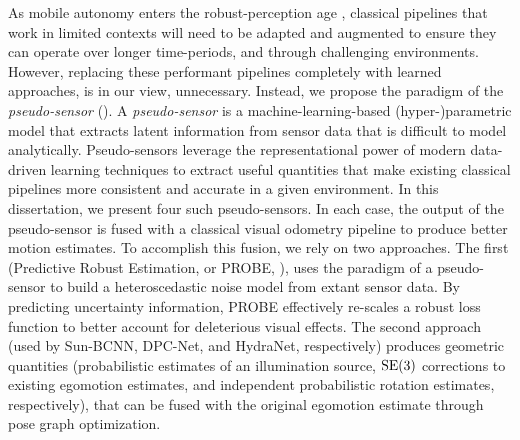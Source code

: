 As mobile autonomy enters the robust-perception age \citep{Cadena2016-ds}, classical pipelines that work in limited contexts will need to be adapted and augmented to ensure they can operate over longer time-periods, and through challenging environments. However, replacing these performant pipelines completely with learned approaches, is in our view, unnecessary. Instead, we propose the paradigm of the  \textit{pseudo-sensor} (). A \textit{pseudo-sensor} is a machine-learning-based (hyper-)parametric model that extracts latent information from sensor data that is difficult to model analytically. Pseudo-sensors leverage the representational power of modern data-driven learning techniques to extract useful quantities that make existing classical pipelines more consistent and accurate in a given environment. In this dissertation, we present four such pseudo-sensors. In each case, the output of the pseudo-sensor is fused with a classical visual odometry pipeline to produce better motion estimates. To accomplish this fusion, we rely on two approaches. The first (Predictive Robust Estimation, or PROBE, ), uses the paradigm of a pseudo-sensor to build a heteroscedastic noise model from extant sensor data. By predicting uncertainty information, PROBE effectively re-scales a robust loss function to better account for deleterious visual effects. The second approach (used by Sun-BCNN, DPC-Net, and HydraNet,   respectively) produces geometric quantities (probabilistic estimates of an illumination source, $\mathrm{SE}(3)$ corrections to existing egomotion estimates, and independent probabilistic rotation estimates, respectively), that can be fused with the original egomotion estimate through pose graph optimization.


